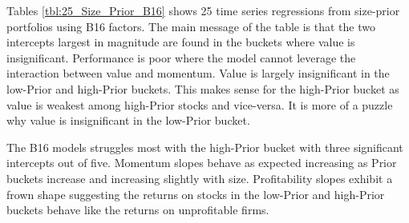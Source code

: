 
Tables \ref{tbl:25_Size_Prior_B16} shows 25 time series regressions from size-prior
portfolios using B16 factors. The main message of the table is that the two intercepts
largest in magnitude are found in the buckets where value is insignificant. Performance is
poor where the model cannot leverage the interaction between value and momentum. Value is
largely insignificant in the low-Prior and high-Prior buckets. This makes sense for the
high-Prior bucket as value is weakest among high-Prior stocks and vice-versa. It is more
of a puzzle why value is insignificant in the low-Prior bucket.

The B16 models struggles most with the high-Prior bucket with three significant intercepts
out of five. Momentum slopes behave as expected increasing as Prior buckets increase and
increasing slightly with size. Profitability slopes exhibit a frown shape suggesting the
returns on stocks in the low-Prior and high-Prior buckets behave like the returns on
unprofitable firms.
